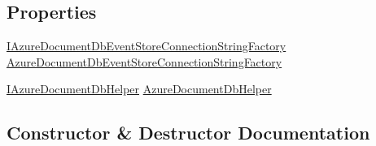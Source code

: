 \subsection*{Properties}
\begin{DoxyCompactItemize}
\item 
\hyperlink{interfaceCqrs_1_1Azure_1_1DocumentDb_1_1Events_1_1IAzureDocumentDbEventStoreConnectionStringFactory}{I\+Azure\+Document\+Db\+Event\+Store\+Connection\+String\+Factory} \hyperlink{classCqrs_1_1Azure_1_1DocumentDb_1_1Events_1_1AzureDocumentDbEventStore_a5a651f82c71bf8bd51114a3dc63a87a6}{Azure\+Document\+Db\+Event\+Store\+Connection\+String\+Factory}
\item 
\hyperlink{interfaceCqrs_1_1Azure_1_1DocumentDb_1_1IAzureDocumentDbHelper}{I\+Azure\+Document\+Db\+Helper} \hyperlink{classCqrs_1_1Azure_1_1DocumentDb_1_1Events_1_1AzureDocumentDbEventStore_a2029bdf083085da168d554c9922e9dfe}{Azure\+Document\+Db\+Helper}
\end{DoxyCompactItemize}


\subsection{Constructor \& Destructor Documentation}
\mbox{\label{classCqrs_1_1Azure_1_1DocumentDb_1_1Events_1_1AzureDocumentDbEventStore_a0bbf294600f2dcebfcca28143aacd430}} 

